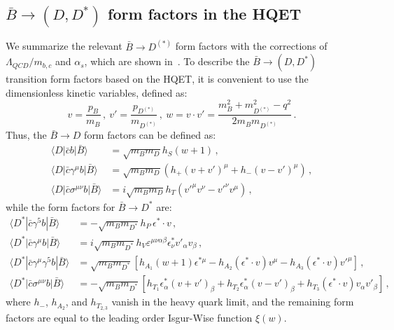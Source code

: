 \documentclass[prd,preprint,superscriptaddress,amsmath,amssymb]{revtex4}
\begin{document}
 \subsection{$\bar B\to (D,D^*)$ form factors in the HQET}
 
We summarize the relevant $\bar B\to D^{(*)}$ form factors with the corrections of $\Lambda_{QCD}/m_{b,c}$ and $\alpha_s$, which are shown  in~\cite{Bernlochner:2017jka}.   To describe the $\bar B\to (D, D^*)$ transition form factors based on the HQET, it is convenient to use the dimensionless kinetic variables, defined as:
  \begin{equation}
  v=\frac{p_B}{m_B}\,, \  v'=\frac{p_{D^{(*)}}}{m_{D^{(*)}}}\,, \ w= v\cdot v' = \frac{m^2_B + m^2 _{D^{(*)}} -q^2 }{2 m_B m_{D^{(*)}}}\,.
  \end{equation}
  Thus,   the $\bar B\to D$ form factors  can be defined as:
  \begin{align}
  \langle D| \bar c b| \bar B\rangle &= \sqrt{m_B m_D} h_S (w+1)\,, \nonumber \\
   \langle D| \bar c \gamma^\mu  b| \bar B\rangle &= \sqrt{m_B m_D} \left( h_+ (v+v')^\mu + h_{-} (v-v')^\mu \right)\,, \nonumber \\
    \langle D| \bar c \sigma^{\mu \nu}   b| \bar B\rangle &= i \sqrt{m_B m_D}  h_T \left( v'^{\mu} v^{\nu} - v'^\nu v^\mu \right)\,,
     \label{eq:HQETBP}
  \end{align}
 while the form factors for  $\bar B\to D^*$ are:
  \begin{align}
   \langle D^* | \bar c \gamma^5 b| \bar B\rangle &= -\sqrt{m_B m_{D^*}} h_P \, \epsilon^* \cdot v \,, \nonumber \\
    \langle D^* | \bar c \gamma^\mu  b| \bar B\rangle &= i \sqrt{m_B m_{D^*}} h_V \varepsilon^{\mu \nu \alpha \beta} \epsilon^*_\nu v'_\alpha v_\beta \,, \nonumber \\
     \langle D^* | \bar c \gamma^\mu  \gamma^5 b| \bar B\rangle &= \sqrt{m_B m_{D^*}} \left[ h_{A_1} ( w+1) \epsilon^{*\mu} -h_{A_2} (\epsilon^*\cdot v) v^\mu - h_{A_3} (\epsilon^* \cdot v) v'^\mu   \right]\,, \nonumber \\
   \langle D^* | \bar c \sigma^{\mu\nu}   b| \bar B\rangle &=  - \sqrt{m_B m_{D^*}} \left[ h_{T_1} \epsilon^*_\alpha (v+ v')_\beta + h_{T_2} \epsilon^*_\alpha ( v-v')_\beta + h_{T_3} (\epsilon^*\cdot v ) v_\alpha v'_\beta \right]\,,
  \end{align}
where $h_{-}$, $h_{A_2}$, and $h_{T_{2,3}}$  vanish  in the heavy quark limit,  and the remaining form factors are equal to the leading order Isgur-Wise function $\xi(w)$.
 
\end{document}
